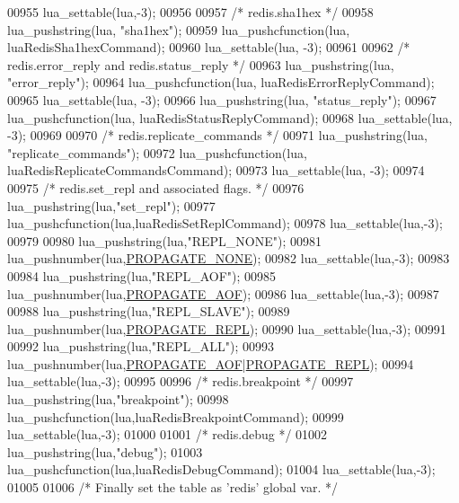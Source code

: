 \begin{DoxyCode}
{{{{{{{{00955     lua\_settable(lua,-3);
00956 
00957     \textcolor{comment}{/* redis.sha1hex */}
00958     lua\_pushstring(lua, \textcolor{stringliteral}{"sha1hex"});
00959     lua\_pushcfunction(lua, luaRedisSha1hexCommand);
00960     lua\_settable(lua, -3);
00961 
00962     \textcolor{comment}{/* redis.error\_reply and redis.status\_reply */}
00963     lua\_pushstring(lua, \textcolor{stringliteral}{"error\_reply"});
00964     lua\_pushcfunction(lua, luaRedisErrorReplyCommand);
00965     lua\_settable(lua, -3);
00966     lua\_pushstring(lua, \textcolor{stringliteral}{"status\_reply"});
00967     lua\_pushcfunction(lua, luaRedisStatusReplyCommand);
00968     lua\_settable(lua, -3);
00969 
00970     \textcolor{comment}{/* redis.replicate\_commands */}
00971     lua\_pushstring(lua, \textcolor{stringliteral}{"replicate\_commands"});
00972     lua\_pushcfunction(lua, luaRedisReplicateCommandsCommand);
00973     lua\_settable(lua, -3);
00974 
00975     \textcolor{comment}{/* redis.set\_repl and associated flags. */}
00976     lua\_pushstring(lua,\textcolor{stringliteral}{"set\_repl"});
00977     lua\_pushcfunction(lua,luaRedisSetReplCommand);
00978     lua\_settable(lua,-3);
00979 
00980     lua\_pushstring(lua,\textcolor{stringliteral}{"REPL\_NONE"});
00981     lua\_pushnumber(lua,\hyperlink{server_8h_a0c7409da047d754c0adeb001025acc03}{PROPAGATE\_NONE});
00982     lua\_settable(lua,-3);
00983 
00984     lua\_pushstring(lua,\textcolor{stringliteral}{"REPL\_AOF"});
00985     lua\_pushnumber(lua,\hyperlink{server_8h_a542fb79924ca427c866fd63632f60777}{PROPAGATE\_AOF});
00986     lua\_settable(lua,-3);
00987 
00988     lua\_pushstring(lua,\textcolor{stringliteral}{"REPL\_SLAVE"});
00989     lua\_pushnumber(lua,\hyperlink{server_8h_a59c6e025b4ed85642a0472fc3e73e298}{PROPAGATE\_REPL});
00990     lua\_settable(lua,-3);
00991 
00992     lua\_pushstring(lua,\textcolor{stringliteral}{"REPL\_ALL"});
00993     lua\_pushnumber(lua,\hyperlink{server_8h_a542fb79924ca427c866fd63632f60777}{PROPAGATE\_AOF}|\hyperlink{server_8h_a59c6e025b4ed85642a0472fc3e73e298}{PROPAGATE\_REPL});
00994     lua\_settable(lua,-3);
00995 
00996     \textcolor{comment}{/* redis.breakpoint */}
00997     lua\_pushstring(lua,\textcolor{stringliteral}{"breakpoint"});
00998     lua\_pushcfunction(lua,luaRedisBreakpointCommand);
00999     lua\_settable(lua,-3);
01000 
01001     \textcolor{comment}{/* redis.debug */}
01002     lua\_pushstring(lua,\textcolor{stringliteral}{"debug"});
01003     lua\_pushcfunction(lua,luaRedisDebugCommand);
01004     lua\_settable(lua,-3);
01005 
01006     \textcolor{comment}{/* Finally set the table as 'redis' global var. */}
}}}}}}}}
\end{DoxyCode}
